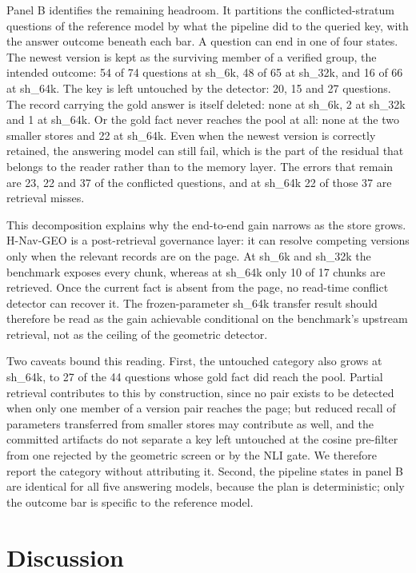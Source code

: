\documentclass[journal=jcisd8,manuscript=article]{achemso}
\begin{document}
Panel B identifies the remaining headroom. It partitions the conflicted-stratum questions of the reference model by what the pipeline did to the queried key, with the answer outcome beneath each bar. A question can end in one of four states. The newest version is kept as the surviving member of a verified group, the intended outcome: 54 of 74 questions at sh\_6k, 48 of 65 at sh\_32k, and 16 of 66 at sh\_64k. The key is left untouched by the detector: 20, 15 and 27 questions. The record carrying the gold answer is itself deleted: none at sh\_6k, 2 at sh\_32k and 1 at sh\_64k. Or the gold fact never reaches the pool at all: none at the two smaller stores and 22 at sh\_64k. Even when the newest version is correctly retained, the answering model can still fail, which is the part of the residual that belongs to the reader rather than to the memory layer. The errors that remain are 23, 22 and 37 of the conflicted questions, and at sh\_64k 22 of those 37 are retrieval misses.

This decomposition explains why the end-to-end gain narrows as the store grows. H-Nav-GEO is a post-retrieval governance layer: it can resolve competing versions only when the relevant records are on the page. At sh\_6k and sh\_32k the benchmark exposes every chunk, whereas at sh\_64k only 10 of 17 chunks are retrieved. Once the current fact is absent from the page, no read-time conflict detector can recover it. The frozen-parameter sh\_64k transfer result should therefore be read as the gain achievable conditional on the benchmark's upstream retrieval, not as the ceiling of the geometric detector.

Two caveats bound this reading. First, the untouched category also grows at sh\_64k, to 27 of the 44 questions whose gold fact did reach the pool. Partial retrieval contributes to this by construction, since no pair exists to be detected when only one member of a version pair reaches the page; but reduced recall of parameters transferred from smaller stores may contribute as well, and the committed artifacts do not separate a key left untouched at the cosine pre-filter from one rejected by the geometric screen or by the NLI gate. We therefore report the category without attributing it. Second, the pipeline states in panel B are identical for all five answering models, because the plan is deterministic; only the outcome bar is specific to the reference model.

\section{Discussion}
\end{document}

